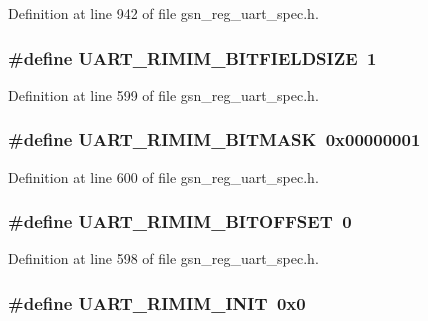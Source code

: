 Definition at line 942 of file gsn\_\-reg\_\-uart\_\-spec.h.

\hypertarget{a00575_ac40a12b61df41065b1f81b4b0e14c305}{
\subsubsection[{UART\_\-RIMIM\_\-BITFIELDSIZE}]{\setlength{\rightskip}{0pt plus 5cm}\#define UART\_\-RIMIM\_\-BITFIELDSIZE~1}}
\label{a00575_ac40a12b61df41065b1f81b4b0e14c305}


Definition at line 599 of file gsn\_\-reg\_\-uart\_\-spec.h.

\hypertarget{a00575_aba0bdb428f5a5119f7a8e44fbc458bb5}{
\subsubsection[{UART\_\-RIMIM\_\-BITMASK}]{\setlength{\rightskip}{0pt plus 5cm}\#define UART\_\-RIMIM\_\-BITMASK~0x00000001}}
\label{a00575_aba0bdb428f5a5119f7a8e44fbc458bb5}


Definition at line 600 of file gsn\_\-reg\_\-uart\_\-spec.h.

\hypertarget{a00575_ad183710eb8e16ff70231631ca899e2d6}{
\subsubsection[{UART\_\-RIMIM\_\-BITOFFSET}]{\setlength{\rightskip}{0pt plus 5cm}\#define UART\_\-RIMIM\_\-BITOFFSET~0}}
\label{a00575_ad183710eb8e16ff70231631ca899e2d6}


Definition at line 598 of file gsn\_\-reg\_\-uart\_\-spec.h.

\hypertarget{a00575_a45229e1cc076b48d4ee22a000d96c3a7}{
\subsubsection[{UART\_\-RIMIM\_\-INIT}]{\setlength{\rightskip}{0pt plus 5cm}\#define UART\_\-RIMIM\_\-INIT~0x0}}
\label{a00575_a45229e1cc076b48d4ee22a000d96c3a7}



